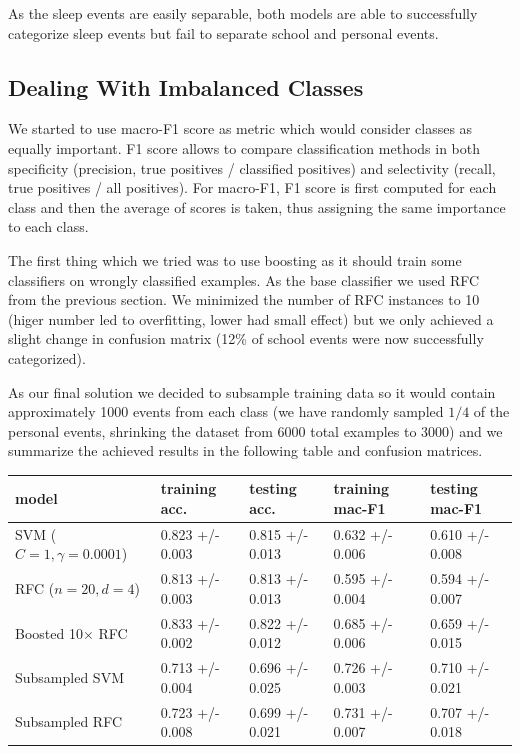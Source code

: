 \documentclass[a4paper, 12pt]{article}
\begin{document}
As the sleep events are easily separable, both models are able to successfully
categorize sleep events but fail to separate school and personal events.

\subsection{Dealing With Imbalanced Classes}
We started to use macro-F1 score as metric which would consider classes 
as equally important. F1 score allows to compare classification methods
in both specificity (precision, true positives / classified positives) and 
selectivity (recall, true positives / all positives). For macro-F1, F1 score
is first computed for each class and then the average of scores is taken, thus
assigning the same importance to each class. 

The first thing which we tried was to use boosting as it should train some
classifiers on wrongly classified examples. As the base classifier we used
RFC from the previous section. We minimized the number of RFC instances
to 10 (higer number led to overfitting, lower had small effect) but we
only achieved a slight change in confusion matrix (12\% of school events
were now successfully categorized).

As our final solution we decided to subsample training data so it would contain
approximately 1000 events from each class (we have randomly sampled $1/4$ of 
the personal events, shrinking the dataset from 6000 total examples to 3000) 
and we summarize the achieved results in the following table and confusion matrices.

\begin{table}[h!]
\centering
\begin{tabular}{ l l l l l }
model & training acc. & testing acc. & training mac-F1 & testing mac-F1 \\ \hline  
SVM ($C=1, \gamma=0.0001$) & 0.823 +/- 0.003  & 0.815 +/- 0.013 & 0.632 +/- 0.006 & 0.610 +/- 0.008\\
RFC ($n=20, d=4$) & 0.813 +/- 0.003 & 0.813 +/- 0.013 & 0.595 +/- 0.004 & 0.594 +/- 0.007\\
Boosted 10$\times$ RFC & 0.833 +/- 0.002 & 0.822 +/- 0.012 & 0.685 +/- 0.006 & 0.659 +/- 0.015\\
Subsampled SVM & 0.713 +/- 0.004 & 0.696 +/- 0.025 & 0.726 +/- 0.003 & 0.710 +/- 0.021 \\
Subsampled RFC & 0.723 +/- 0.008 & 0.699 +/- 0.021 & 0.731 +/- 0.007 & 0.707 +/- 0.018
\end{tabular}
\end{table}
\end{document}
